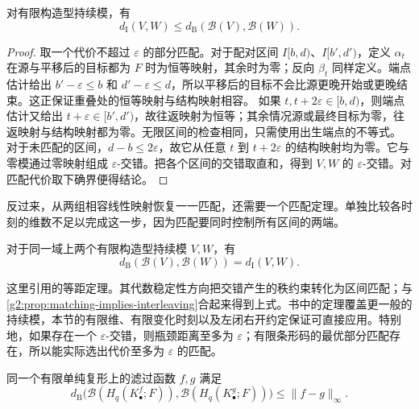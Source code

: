 \begin{proposition}\label{g2:prop:matching-implies-interleaving}
	对有限构造型持续模，有
	\[
		d_{\mathrm I}(V,W)\leq d_{\mathrm B}(\mathcal B(V),\mathcal B(W)).
	\]
\end{proposition}

\begin{proof}
	取一个代价不超过 \(\varepsilon\) 的部分匹配。对于配对区间 \(I[b,d)\)、\(I[b',d')\)，定义 \(\alpha_t\) 在源与平移后的目标都为 \(F\) 时为恒等映射，其余时为零；反向 \(\beta_t\) 同样定义。端点估计给出 \(b'-\varepsilon\leq b\) 和 \(d'-\varepsilon\leq d\)，所以平移后的目标不会比源更晚开始或更晚结束。这正保证重叠处的恒等映射与结构映射相容。
	\ProseParagraphBreak
	如果 \(t,t+2\varepsilon\in[b,d)\)，则端点估计又给出 \(t+\varepsilon\in[b',d')\)，故往返映射为恒等；其余情况源或最终目标为零，往返映射与结构映射都为零。无限区间的检查相同，只需使用出生端点的不等式。
	\ProseParagraphBreak
	对于未匹配的区间，\(d-b\leq2\varepsilon\)，故它从任意 \(t\) 到 \(t+2\varepsilon\) 的结构映射均为零。它与零模通过零映射组成 \(\varepsilon\)-交错。把各个区间的交错取直和，得到 \(V,W\) 的 \(\varepsilon\)-交错。对匹配代价取下确界便得结论。
\end{proof}

反过来，从两组相容线性映射恢复一一匹配，还需要一个匹配定理。单独比较各时刻的维数不足以完成这一步，因为匹配要同时控制所有区间的两端。

\begin{theorem}[持续模等距定理]\label{g2:thm:persistence-isometry}
	对于同一域上两个有限构造型持续模 \(V,W\)，有
	\[
		d_{\mathrm B}(\mathcal B(V),\mathcal B(W))=d_{\mathrm I}(V,W).
	\]
\end{theorem}

这里引用\cite[第5章，The Isometry Theorem]{ChazalDeSilvaGlisseOudot2016}的等距定理。其代数稳定性方向把交错产生的秩约束转化为区间匹配；与\cref{g2:prop:matching-implies-interleaving}合起来得到上式。书中的定理覆盖更一般的持续模，本节的有限维、有限变化时刻以及左闭右开约定保证可直接应用。特别地，如果存在一个 \(\varepsilon\)-交错，则瓶颈距离至多为 \(\varepsilon\)；有限条形码的最优部分匹配存在，所以能实际选出代价至多为 \(\varepsilon\) 的匹配。

\begin{corollary}\label{g2:cor:finite-filtration-stability}
	同一个有限单纯复形上的滤过函数 \(f,g\) 满足
	\[
		d_{\mathrm B}\bigl(\mathcal B(H_q(K^f_\bullet;F)),\mathcal B(H_q(K^g_\bullet;F))\bigr)
		\leq\|f-g\|_\infty.
	\]
\end{corollary}

